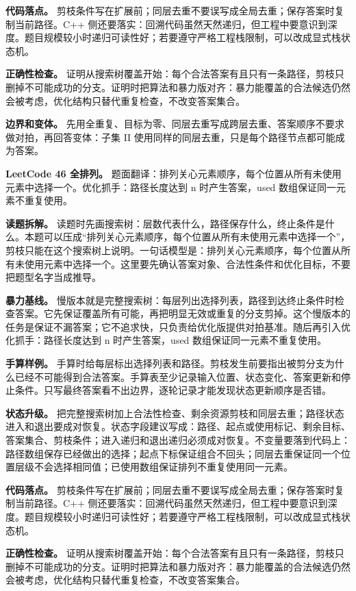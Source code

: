 \textbf{代码落点。} 剪枝条件写在扩展前；同层去重不要误写成全局去重；保存答案时复制当前路径。C++ 侧还要落实：回溯代码虽然天然递归，但工程中要意识到深度。题目规模较小时递归可读性好；若要遵守严格工程栈限制，可以改成显式栈状态机。

\textbf{正确性检查。} 证明从搜索树覆盖开始：每个合法答案有且只有一条路径，剪枝只删掉不可能成功的分支。证明时把算法和暴力版对齐：暴力能覆盖的合法候选仍然会被考虑，优化结构只替代重复检查，不改变答案集合。

\textbf{边界和变体。} 先用全重复、目标为零、同层去重写成跨层去重、答案顺序不要求做对拍，再回答变体：子集 II 使用同样的同层去重，只是每个路径节点都可能成为答案。

\noindent\textbf{LeetCode 46 全排列。} 题面翻译：排列关心元素顺序，每个位置从所有未使用元素中选择一个。优化抓手：路径长度达到 n 时产生答案，used 数组保证同一元素不重复使用。

\textbf{读题拆解。} 读题时先画搜索树：层数代表什么，路径保存什么，终止条件是什么。本题可以压成“排列关心元素顺序，每个位置从所有未使用元素中选择一个”，剪枝只能在这个搜索树上说明。一句话模型是：排列关心元素顺序，每个位置从所有未使用元素中选择一个。这里要先确认答案对象、合法性条件和优化目标，不要把题型名字当成推导。

\textbf{暴力基线。} 慢版本就是完整搜索树：每层列出选择列表，路径到达终止条件时检查答案。它先保证覆盖所有可能，再把明显无效或重复的分支剪掉。这个慢版本的任务是保证不漏答案；它不追求快，只负责给优化版提供对拍基准。随后再引入优化抓手：路径长度达到 n 时产生答案，used 数组保证同一元素不重复使用。

\textbf{手算样例。} 手算时给每层标出选择列表和路径。剪枝发生前要指出被剪分支为什么已经不可能得到合法答案。手算表至少记录输入位置、状态变化、答案更新和停止条件。只写最终答案看不出边界，逐轮记录才能发现状态更新顺序是否错。

\textbf{状态升级。} 把完整搜索树加上合法性检查、剩余资源剪枝和同层去重；路径状态进入和退出要成对恢复。状态字段建议写成：路径、起点或使用标记、剩余目标、答案集合、剪枝条件；进入递归和退出递归必须成对恢复。不变量要落到代码上：路径数组保存已经做出的选择；起点下标保证组合不回头；同层去重保证同一个位置层级不会选择相同值；已使用数组保证排列不重复使用同一元素。

\textbf{代码落点。} 剪枝条件写在扩展前；同层去重不要误写成全局去重；保存答案时复制当前路径。C++ 侧还要落实：回溯代码虽然天然递归，但工程中要意识到深度。题目规模较小时递归可读性好；若要遵守严格工程栈限制，可以改成显式栈状态机。

\textbf{正确性检查。} 证明从搜索树覆盖开始：每个合法答案有且只有一条路径，剪枝只删掉不可能成功的分支。证明时把算法和暴力版对齐：暴力能覆盖的合法候选仍然会被考虑，优化结构只替代重复检查，不改变答案集合。

